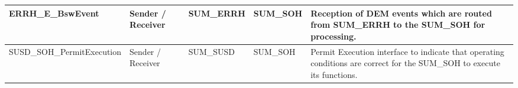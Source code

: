 \begin{longtable}{|l|l|l|l|l|}
\hline\hline
\endhead
\hline
\endfoot
\hline
\endlastfoot
\begin{minipage}{0.42\linewidth}\raggedright\vspace{.75ex}ERRH\_E\_BswEvent\vspace{.75ex}\end{minipage} & \begin{minipage}{0.07\linewidth}\raggedright\vspace{.75ex}Sender / Receiver\vspace{.75ex}\end{minipage} & \begin{minipage}{0.10\linewidth}\raggedright\vspace{.75ex}SUM\_ERRH\vspace{.75ex}\end{minipage} & \begin{minipage}{0.10\linewidth}\raggedright\vspace{.75ex}SUM\_SOH\vspace{.75ex}\end{minipage} & \begin{minipage}{0.17\linewidth}\raggedright\vspace{.75ex}Reception of DEM events which are routed from SUM\_ERRH to the SUM\_SOH for processing.\vspace{.75ex}\end{minipage}\\\hline
\begin{minipage}{0.42\linewidth}\raggedright\vspace{.75ex}SUSD\_SOH\_PermitExecution\vspace{.75ex}\end{minipage} & \begin{minipage}{0.07\linewidth}\raggedright\vspace{.75ex}Sender / Receiver\vspace{.75ex}\end{minipage} & \begin{minipage}{0.10\linewidth}\raggedright\vspace{.75ex}SUM\_SUSD\vspace{.75ex}\end{minipage} & \begin{minipage}{0.10\linewidth}\raggedright\vspace{.75ex}SUM\_SOH\vspace{.75ex}\end{minipage} & \begin{minipage}{0.17\linewidth}\raggedright\vspace{.75ex}Permit Execution interface to indicate that operating conditions are correct for the SUM\_SOH to execute its functions.\vspace{.75ex}\end{minipage}\\\hline

\end{longtable}

